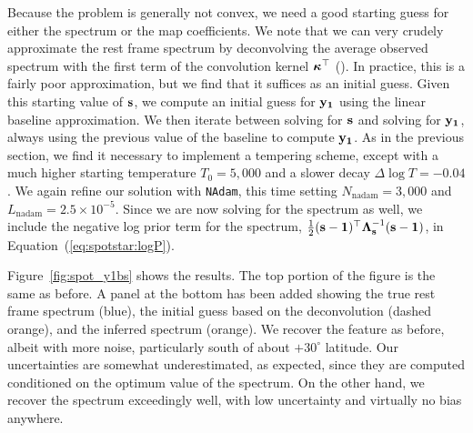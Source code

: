\documentclass[modern]{aastex631}
\begin{document}

Because the problem is generally not convex, we need a good starting guess for either the spectrum or the map coefficients. 
We note that we can very crudely approximate the rest frame spectrum by deconvolving the average observed spectrum with the first term of the convolution kernel $\boldsymbol{\kappa}^\top$ ().
In practice, this is a fairly poor approximation, but we find that it suffices as an initial guess. 
Given this starting value of ${\mathbf{s}}$, we compute an initial guess for ${\mathbf{y_1}}$ using the linear baseline approximation. 
We then iterate between solving for ${\mathbf{s}}$ and solving for ${\mathbf{y_1}}$, always using the previous value of the baseline to compute ${\mathbf{y_1}}$. 
As in the previous section, we find it necessary to implement a tempering scheme, except with a much higher starting temperature $T_0 = 5,000$ and a slower decay $\Delta\log T = -0.04$.
We again refine our solution with \texttt{NAdam}, this time setting $N_\mathrm{nadam} = 3,000$ and $L_\mathrm{nadam} = 2.5\times 10^{-5}$. 
Since we are now solving for the spectrum as well, we include the negative log prior term for the spectrum, $\frac{1}{2}({\mathbf{s - 1}})^\top \boldsymbol{\Lambda}_{\mathbf{s}}^{-1}({\mathbf{s - 1}})$, in Equation~(\ref{eq:spotstar:logP}).

Figure~\ref{fig:spot_y1bs} shows the results. 
The top portion of the figure is the same as before. 
A panel at the bottom has been added showing the true rest frame spectrum (blue), the initial guess based on the deconvolution (dashed orange), and the inferred spectrum (orange). 
We recover the \spot feature as before, albeit with more noise, particularly south of about $+30^\circ$ latitude. 
Our uncertainties are somewhat underestimated, as expected, since they are computed conditioned on the optimum value of the spectrum. 
On the other hand, we recover the spectrum exceedingly well, with low uncertainty and virtually no bias anywhere.
\end{document}
